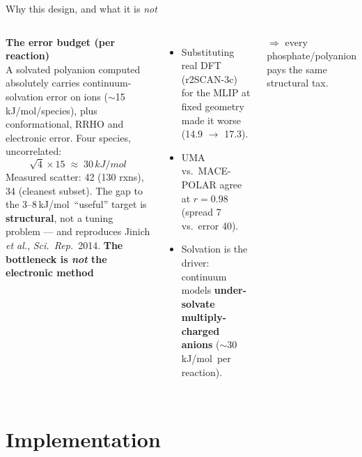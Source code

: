 \documentclass[aspectratio=169,11pt]{beamer}
\newcommand{\kj}{\,kJ/mol}
\newcommand{\lose}[1]{\textcolor{bad}{#1}}
\begin{document}
\begin{frame}{Why this design, and what it is \emph{not}}
  \begin{columns}[T]
      \textbf{The error budget (per reaction)}\\[0.3em]
      A solvated polyanion computed absolutely carries continuum-solvation
      error on ions ($\sim$15\kj/species), plus conformational, RRHO and
      electronic error. Four species, uncorrelated:
      \[
        \sqrt{4}\times 15 \;\approx\; 30\kj
      \]
      Measured scatter: 42 (130 rxns), 34 (cleanest subset).
      The gap to the 3--8\kj\ ``useful'' target is \textbf{structural}, not a
      tuning problem — and reproduces Jinich \emph{et al.}, \emph{Sci.\ Rep.}\ 2014.
      \textbf{The bottleneck is \emph{not} the electronic method}\\[0.3em]
      \begin{itemize}
        \item Substituting real DFT (r2SCAN-3c) for the MLIP at fixed
              geometry made it \lose{worse} (14.9 $\to$ 17.3).
        \item UMA vs.\ MACE-POLAR agree at $r=0.98$ (spread 7 vs.\ error 40).
        \item Solvation is the driver: continuum models
              \textbf{under-solvate multiply-charged anions}
              ($\sim$30\kj\ per reaction).
      \end{itemize}
      \vspace{0.3em}
      $\Rightarrow$ every phosphate/polyanion pays the same structural tax.
  \end{columns}
\end{frame}

\section{Implementation}
\end{document}

